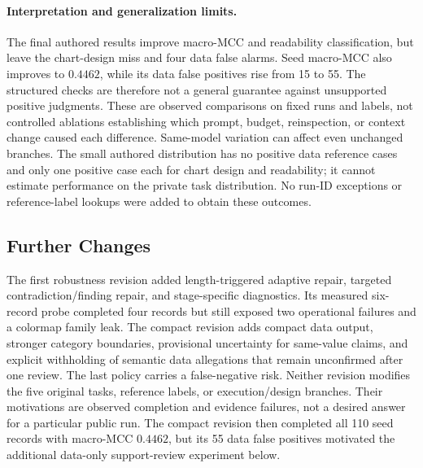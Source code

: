 \documentclass[11pt]{article}
\begin{document}
\paragraph{Interpretation and generalization limits.}
The final authored results improve macro-MCC and readability
classification, but leave the chart-design miss and four data false
alarms. Seed macro-MCC also improves to $0.4462$, while its data false
positives rise from 15 to 55. The structured checks are therefore not
a general guarantee against unsupported positive judgments.
These are observed comparisons on fixed runs and labels, not controlled
ablations establishing which prompt, budget, reinspection, or context
change caused each difference. Same-model variation can affect even
unchanged branches. The small authored distribution has no positive
data reference cases and only one positive case each for chart design
and readability; it cannot estimate performance on the private task
distribution. No run-ID exceptions or reference-label lookups were added
to obtain these outcomes.

\subsection{Further Changes}
The first robustness revision added length-triggered adaptive repair,
targeted contradiction/finding repair, and stage-specific diagnostics.
Its measured six-record probe completed four records but still exposed
two operational failures and a colormap family leak. The compact revision
adds compact data output, stronger category boundaries, provisional
uncertainty for same-value claims, and explicit withholding of semantic
data allegations that remain unconfirmed after one review. The last
policy carries a false-negative risk. Neither revision modifies the five original
tasks, reference labels, or execution/design branches. Their motivations
are observed completion and evidence failures, not a desired answer for
a particular public run. The compact revision then completed all 110 seed
records with macro-MCC $0.4462$, but its 55 data false positives motivated
the additional data-only support-review experiment below.
\end{document}
